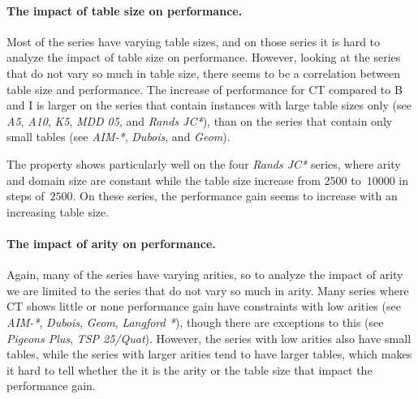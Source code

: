 \documentclass[a4paper,11pt]{article}
\numberwithin{equation}{section}
\begin{document}

\paragraph{The impact of table size on performance.}
Most of the series have varying table sizes, and on those series it is hard to
analyze the impact of table size on performance.
However, looking at the series that do not vary so much in table size,
there seems to be a correlation between table size and performance.
The increase
of performance for CT compared to B and I is larger on the series that contain 
instances with large table sizes only (see \emph{A5}, \emph{A10},
\emph{K5}, \emph{MDD 05}, and \emph{Rands JC*}), than on the series
that contain only small tables (see \emph{AIM-*}, \emph{Dubois}, and \emph{Geom}).

The property shows particularly well on the four \emph{Rands JC*} series, where
arity and domain size are constant while the table size increase from
$2500$ to~$10000$ in steps of~$2500$. On these series, the performance gain
seems to increase with an increasing table size.



\paragraph{The impact of arity on performance.}
Again, many of the series have varying arities, so to analyze the impact of arity
we are limited to the series that do not vary so much in arity.
Many series where CT shows little or none performance gain have
constraints with low arities (see \emph{AIM-*}, \emph{Dubois}, \emph{Geom},
\emph{Langford *}), though there are exceptions to this (see \emph{Pigeons Plus},
\emph{TSP 25/Quat}). 
However, the series with low arities also have small tables, while the series
with larger arities tend to have larger tables, which makes it hard to
tell whether the it is the arity or the table size that impact the performance gain.
\end{document}
